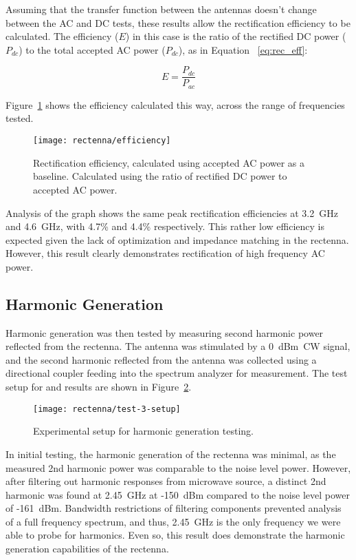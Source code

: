 Assuming that the transfer function between the antennas doesn't change between the AC and DC tests, these results allow the rectification efficiency to be calculated. The efficiency ($E$) in this case is the ratio of the rectified DC power ($P_{dc}$) to the total accepted AC power ($P_{dc}$), as in Equation ~\ref{eq:rec_eff}:

\begin{equation}
E = \frac{P_{dc}}{P_{ac}}
\label{eq:rec_eff}
\end{equation}

Figure~\ref{fig:rectenna-efficiency} shows the efficiency calculated this way, across the range of frequencies tested.

\begin{figure}[h!]
\centering
\texttt{[image: rectenna/efficiency]}
    \caption[Rectification efficiency]{Rectification efficiency, calculated using accepted AC power as a baseline. Calculated using the ratio of rectified DC power to accepted AC power.}
    \label{fig:rectenna-efficiency}
\end{figure}

Analysis of the graph shows the same peak rectification efficiencies at 3.2~GHz and 4.6~GHz, with 4.7\% and 4.4\% respectively. This rather low efficiency is expected given the lack of optimization and impedance matching in the rectenna. However, this result clearly demonstrates rectification of high frequency AC power.

\subsection{Harmonic Generation}

Harmonic generation was then tested by measuring second harmonic power reflected from the rectenna. The antenna was stimulated by a 0~dBm~CW signal, and the second harmonic reflected from the antenna was collected using a directional coupler feeding into the spectrum analyzer for measurement. The test setup for and results are shown in Figure~\ref{fig:rectenna-test-3-setup}.

\begin{figure}[h!]
\centering
\texttt{[image: rectenna/test-3-setup]}
\caption{Experimental setup for harmonic generation testing.}
\label{fig:rectenna-test-3-setup}
\end{figure}

In initial testing, the harmonic generation of the rectenna was minimal, as the measured 2nd harmonic power was comparable to the noise level power. However, after filtering out harmonic responses from microwave source, a distinct 2nd harmonic was found at 2.45~GHz at -150~dBm compared to the noise level power of -161~dBm. Bandwidth restrictions of filtering components prevented analysis of a full frequency spectrum, and thus, 2.45~GHz is the only frequency we were able to probe for harmonics. Even so, this result does demonstrate the harmonic generation capabilities of the rectenna.

